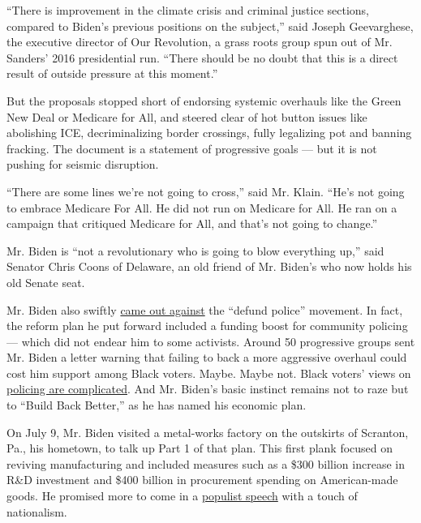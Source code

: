 ``There is improvement in the climate crisis and criminal justice
sections, compared to Biden's previous positions on the subject,'' said
Joseph Geevarghese, the executive director of Our Revolution, a grass
roots group spun out of Mr. Sanders' 2016 presidential run. ``There
should be no doubt that this is a direct result of outside pressure at
this moment.''

But the proposals stopped short of endorsing systemic overhauls like the
Green New Deal or Medicare for All, and steered clear of hot button
issues like abolishing ICE, decriminalizing border crossings, fully
legalizing pot and banning fracking. The document is a statement of
progressive goals --- but it is not pushing for seismic disruption.

``There are some lines we're not going to cross,'' said Mr. Klain.
``He's not going to embrace Medicare For All. He did not run on Medicare
for All. He ran on a campaign that critiqued Medicare for All, and
that's not going to change.''

Mr. Biden is ``not a revolutionary who is going to blow everything up,''
said Senator Chris Coons of Delaware, an old friend of Mr. Biden's who
now holds his old Senate seat.

Mr. Biden also swiftly
\href{https://www.nytimes.com/2020/06/08/us/politics/biden-defund-the-police.html}{came
out against} the ``defund police'' movement. In fact, the reform plan he
put forward included a funding boost for community policing --- which
did not endear him to some activists. Around 50 progressive groups sent
Mr. Biden a letter warning that failing to back a more aggressive
overhaul could cost him support among Black voters. Maybe. Maybe not.
Black voters' views on
\href{https://www.vox.com/2020/6/17/21292046/black-people-abolish-defund-dismantle-police-george-floyd-breonna-taylor-black-lives-matter-protest}{policing
are complicated}. And Mr. Biden's basic instinct remains not to raze but
to ``Build Back Better,'' as he has named his economic plan.

On July 9, Mr. Biden visited a metal-works factory on the outskirts of
Scranton, Pa., his hometown, to talk up Part 1 of that plan. This first
plank focused on reviving manufacturing and included measures such as a
\$300 billion increase in R\&D investment and \$400 billion in
procurement spending on American-made goods. He promised more to come in
a
\href{https://www.nytimes.com/2020/07/09/us/politics/biden-buy-american.html}{populist
speech} with a touch of nationalism.

